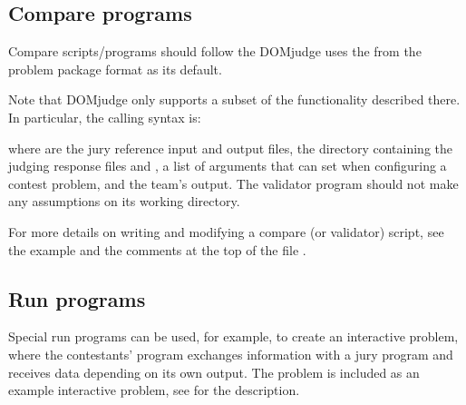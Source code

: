 \documentclass[a4paper,10pt,english,openany]{sphinxmanual}
\begin{document}
\subsection{Compare programs}
\label{\detokenize{config-advanced:compare-programs}}
\sphinxAtStartPar
Compare scripts/programs should follow the 
DOMjudge uses the  from the problem package
format as its default.

\sphinxAtStartPar
Note that DOMjudge only supports a subset of the functionality
described there. In particular, the calling syntax is:

\begin{sphinxVerbatim}[commandchars=\\\{\}]
      
\end{sphinxVerbatim}

\sphinxAtStartPar
where   are the jury
reference input and output files,  the directory
containing the judging response files 
and ,
 a list of arguments that can set when
configuring a contest problem, and  the team’s
output. The validator program should not make any assumptions on its
working directory.

\sphinxAtStartPar
For more details on writing and modifying a compare (or validator)
script, see the  example and the comments at the
top of the file .


\subsection{Run programs}
\label{\detokenize{config-advanced:run-programs}}
\sphinxAtStartPar
Special run programs can be used, for example, to create an interactive
problem, where the contestants’ program exchanges information with a
jury program and receives data depending on its own output. The
problem  is included as an example interactive
problem, see  for the description.
\end{document}
